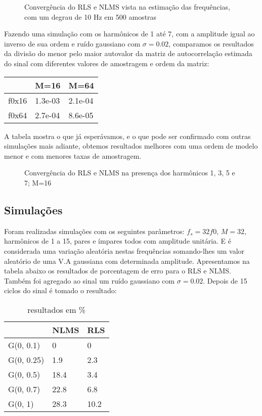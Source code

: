 \documentclass[a4paper, 12pt]{book}
\begin{document}
\begin{figure}[h]
	\centering    
	\def\svgwidth{\columnwidth}
	
	\caption{Convergência do RLS e NLMS vista na estimação das frequências, com um degrau de 10 Hz em 500 amostras}
	\label{fig:your image label}
\end{figure}

Fazendo uma simulação com os harmônicos de 1 até 7, com a amplitude igual ao inverso de sua ordem e ruído gaussiano com $\sigma=0.02$, comparamos os resultados da divisão do menor pelo maior autovalor da matriz de autocorrelação estimada do sinal com diferentes valores de amostragem e ordem da matriz:

\begin{table}[H]
	\centering
	\begin{tabular}{l|l|l}
		   & M=16 & M=64 \\
		\hline 
		f0x16      & 1.3e-03 & 2.1e-04 \\
		f0x64      & 2.7e-04  & 8.6e-05       
	\end{tabular}
\end{table}

A tabela mostra o que já esperávamos, e o que pode ser confirmado com outras simulações mais adiante, obtemos resultados melhores com uma ordem de modelo menor e com menores taxas de amostragem.

\begin{figure}[h]
	\centering    
	\def\svgwidth{\columnwidth}
	
	\caption{Convergência do RLS e NLMS na presença dos harmônicos 1, 3, 5 e 7; M=16}
	\label{fig:your image label}
\end{figure}

\subsection{Simulações }

\indent Foram realizadas simulações com os seguintes parâmetros: $f_s=32f0$, $M=32$, harmônicos de 1 a 15, pares e ímpares todos com amplitude unitária. E é considerada uma variação aleatória nestas frequências somando-lhes um valor aleatório de uma V.A gaussiana com determinada amplitude. Apresentamos na tabela abaixo os resultados de porcentagem de erro para o RLS e NLMS. Também foi agregado ao sinal um ruído gaussiano com $\sigma=0.02$. Depois de 15 ciclos do sinal é tomado o resultado:

\begin{table}[H]
	\centering
	\begin{tabular}{l|l|l}
	              & NLMS & RLS \\
		\hline 
		G(0, 0.1)  & 0     & 0 \\
		G(0, 0.25) & 1.9   & 2.3  \\
		G(0, 0.5)  & 18.4  & 3.4  \\
		G(0, 0.7)  & 22.8  & 6.8  \\
		G(0, 1)    & 28.3  & 10.2 \\ 
	\end{tabular}
	\caption{resultados em \%}
\end{table}
\end{document}
